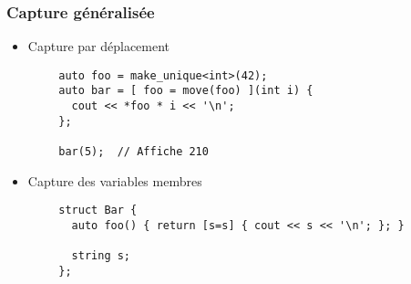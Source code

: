 \documentclass[C++.tex]{subfiles}
\begin{document}
\begin{frame}[fragile]
	\frametitle{Capture généralisée}
	\begin{itemize}
		\item Capture par déplacement
	\end{itemize}

	\begin{verbatim}
		auto foo = make_unique<int>(42);
		auto bar = [ foo = move(foo) ](int i) {
		  cout << *foo * i << '\n';
		};

		bar(5);  // Affiche 210
	\end{verbatim}

	\begin{itemize}
		\item Capture des variables membres
	\end{itemize}

	\begin{verbatim}
		struct Bar {
		  auto foo() { return [s=s] { cout << s << '\n'; }; }

		  string s;
		};
	\end{verbatim}

\end{frame}
\end{document}
